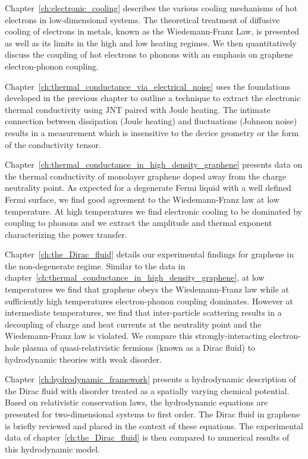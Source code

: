 Chapter~\ref{ch:electronic_cooling} describes the various cooling mechanisms of hot electrons in low-dimensional systems. The  theoretical treatment of diffusive cooling of electrons in metals, known as the Wiedemann-Franz Law, is presented as well as its limits in the high and low heating regimes. We then quantitatively discuss the coupling of hot electrons to phonons with an emphasis on graphene electron-phonon coupling. 

Chapter~\ref{ch:thermal_conductance_via_electrical_noise} uses the foundations developed in the previous chapter to outline a technique to extract the electronic thermal conductivity using JNT paired with Joule heating. The intimate connection between dissipation (Joule heating) and fluctuations (Johnson noise) results in a measurement which is insensitive to the device geometry or the form of the conductivity tensor.

Chapter~\ref{ch:thermal_conductance_in_high_density_graphene} presents data on the thermal conductivity of monolayer graphene doped away from the charge neutrality point. As expected for a degenerate Fermi liquid with a well defined Fermi surface, we find good agreement to the Wiedemann-Franz law at low temperature. At high temperatures we find electronic cooling to be dominated by coupling to phonons and we extract the amplitude and thermal exponent characterizing the power transfer. 

Chapter~\ref{ch:the_Dirac_fluid} details our experimental findings for graphene in the non-degenerate regime. Similar to the data in chapter~\ref{ch:thermal_conductance_in_high_density_graphene}, at low temperatures we find that graphene obeys the Wiedemann-Franz law while at sufficiently high temperatures electron-phonon coupling dominates. However at intermediate temperatures, we find that inter-particle scattering results in a decoupling of charge and heat currents at the neutrality point and the Wiedemann-Franz law is violated. We compare this strongly-interacting electron-hole plasma of quasi-relativistic fermions (known as a Dirac fluid) to hydrodynamic theories with weak disorder.

Chapter~\ref{ch:hydrodynamic_framework} presents a hydrodynamic description of the Dirac fluid with disorder treated as a spatially varying chemical potential. Based on relativistic conservation laws, the hydrodynamic equations are presented for two-dimensional systems to first order. The Dirac fluid in graphene is briefly reviewed and placed in the context of these equations. The experimental data of chapter~\ref{ch:the_Dirac_fluid} is then compared to numerical results of this hydrodynamic model.

